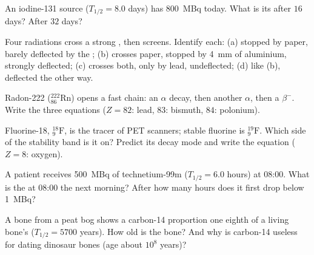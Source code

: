 \begin{exercise}[$\star$]\label{exo:g11:nucleus-radioactivity:5}
An iodine-131 source ($T_{1/2} = 8.0$ days) has  \qty{800}{MBq}
today. What is its  after $16$ days? After $32$ days?
\end{exercise}

\begin{exercise}[$\star\star$]\label{exo:g11:nucleus-radioactivity:6}
Four radiations cross a strong , then screens. Identify each:
(a) stopped by paper, barely deflected by the ; (b) crosses paper,
stopped by \qty{4}{mm} of aluminium, strongly deflected; (c) crosses both,
only  by lead, undeflected; (d) like (b), deflected the other way.
\end{exercise}

\begin{exercise}[$\star\star$]\label{exo:g11:nucleus-radioactivity:7}
Radon-222 (${}^{222}_{86}\mathrm{Rn}$) opens a fast chain: an $\alpha$
decay, then another $\alpha$, then a $\beta^-$. Write the three equations
($Z = 82$: lead, $83$: bismuth, $84$: polonium).
\end{exercise}

\begin{exercise}[$\star\star$]\label{exo:g11:nucleus-radioactivity:8}
Fluorine-18, ${}^{18}_{9}\mathrm{F}$, is the tracer of PET scanners; stable
fluorine is ${}^{19}_{9}\mathrm{F}$. Which side of the stability band is it
on? Predict its decay mode and write the equation ($Z = 8$: oxygen).
\end{exercise}

\begin{exercise}[$\star\star$]\label{exo:g11:nucleus-radioactivity:9}
A patient receives \qty{500}{MBq} of technetium-99m ($T_{1/2} = 6.0$ hours)
at 08:00. What is the  at 08:00 the next morning? After how many
hours does it first drop below \qty{1}{MBq}?
\end{exercise}

\begin{exercise}[$\star\star$]\label{exo:g11:nucleus-radioactivity:10}
A bone from a peat bog shows a carbon-14 proportion one eighth of a living
bone's ($T_{1/2} = \num{5700}$ years). How old is the bone? And why is
carbon-14 useless for dating dinosaur bones (age about $10^{8}$ years)?
\end{exercise}

